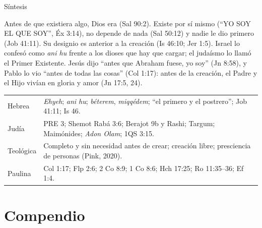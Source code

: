 \begin{frame}{Síntesis}
\begin{tcolorbox}[colback=papiro,colframe=azul,boxrule=1pt,arc=3pt]
\scriptsize Antes de que existiera algo, Dios era (Sal 90:2). Existe por sí mismo (``YO SOY EL QUE SOY'', Éx 3:14), no depende de nada (Sal 50:12) y nadie le dio primero (Job 41:11). Su designio es anterior a la creación (Is 46:10; Jer 1:5). Israel lo confesó como \emph{ani hu} frente a los dioses que hay que cargar; el judaísmo lo llamó el Primer Existente. Jesús dijo ``antes que Abraham fuese, yo soy'' (Jn 8:58), y Pablo lo vio ``antes de todas las cosas'' (Col 1:17): antes de la creación, el Padre y el Hijo vivían en gloria y amor (Jn 17:5, 24).
\end{tcolorbox}
\scriptsize\renewcommand{\arraystretch}{1.12}
\begin{tabular}{@{}>{\RaggedRight\arraybackslash}p{1.7cm}>{\RaggedRight\arraybackslash}p{10.1cm}@{}}
\toprule
Hebrea & \emph{Ehyeh}; \emph{ani hu}; \emph{béterem}, \emph{miqqédem}; ``el primero y el postrero''; Job 41:11; Is 46. \\
Judía & PRE 3; Shemot Rabá 3:6; Berajot 9b y Rashi; Targum; Maimónides; \emph{Adon Olam}; 1QS 3:15. \\
Teológica & Completo y sin necesidad antes de crear; creación libre; presciencia de personas (Pink, 2020). \\
Paulina & Col 1:17; Flp 2:6; 2 Co 8:9; 1 Co 8:6; Hch 17:25; Ro 11:35--36; Ef 1:4. \\
\bottomrule
\end{tabular}
\end{frame}

\section{Compendio}

